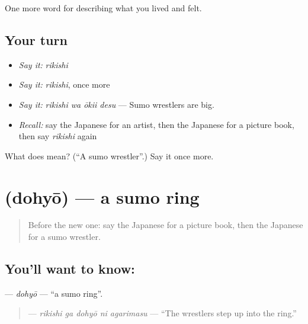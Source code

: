 \begin{grammarlens}[title={What you've built}]
One more word for describing what you lived and felt.
\end{grammarlens}

\subsection*{Your turn}
\begin{itemize}
\raggedright
  \item \emph{Say it:} \emph{rikishi}
  \item \emph{Say it:} \emph{rikishi}, once more
  \item \emph{Say it:} \emph{rikishi wa ōkii desu} — Sumo wrestlers are big.
  \item \emph{Recall:} say the Japanese for an artist, then the Japanese for a picture book, then say \emph{rikishi} again
\end{itemize}

\begin{tcolorbox}[breakable,colback=teal!4,colframe=teal!35!black,title={Before you move on}]
What does  mean? (\textquotedblleft{}A sumo wrestler\textquotedblright{}.) Say it once more.
\end{tcolorbox}
\section[\texorpdfstring{\ja{どひょう} (dohyō)}{どひょう (dohyō)}]{ (dohyō) — a sumo ring}

\label{lesson:JA-C505-dohyou}



\begin{quote}
Before the new one: say the Japanese for a picture book, then the Japanese for a sumo wrestler.
\end{quote}

\subsection*{You'll want to know: }
\textbf{} — \emph{dohyō} — \textquotedblleft{}a sumo ring\textquotedblright{}.

\begin{quote}
\textbf{  } — \emph{rikishi ga dohyō ni agarimasu} — \textquotedblleft{}The wrestlers step up into the ring.\textquotedblright{}
\end{quote}

